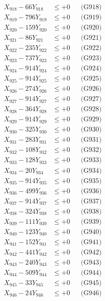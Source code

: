 \documentclass[a4paper,10pt]{article}
\begin{document}
{\begin{align}
X_{918} - 66Y_{918} &\leq +0 && \text{(G918)} \\
X_{919} - 796Y_{919} &\leq +0 && \text{(G919)} \\
X_{920} - 159Y_{920} &\leq +0 && \text{(G920)} \\
\allowbreak
X_{921} - 86Y_{921} &\leq +0 && \text{(G921)} \\
X_{922} - 235Y_{922} &\leq +0 && \text{(G922)} \\
X_{923} - 737Y_{923} &\leq +0 && \text{(G923)} \\
X_{924} - 914Y_{924} &\leq +0 && \text{(G924)} \\
X_{925} - 914Y_{925} &\leq +0 && \text{(G925)} \\
X_{926} - 274Y_{926} &\leq +0 && \text{(G926)} \\
X_{927} - 914Y_{927} &\leq +0 && \text{(G927)} \\
X_{928} - 364Y_{928} &\leq +0 && \text{(G928)} \\
X_{929} - 914Y_{929} &\leq +0 && \text{(G929)} \\
X_{930} - 325Y_{930} &\leq +0 && \text{(G930)} \\
\allowbreak
X_{931} - 283Y_{931} &\leq +0 && \text{(G931)} \\
X_{932} - 108Y_{932} &\leq +0 && \text{(G932)} \\
X_{933} - 128Y_{933} &\leq +0 && \text{(G933)} \\
X_{934} - 20Y_{934} &\leq +0 && \text{(G934)} \\
X_{935} - 914Y_{935} &\leq +0 && \text{(G935)} \\
X_{936} - 499Y_{936} &\leq +0 && \text{(G936)} \\
X_{937} - 914Y_{937} &\leq +0 && \text{(G937)} \\
X_{938} - 324Y_{938} &\leq +0 && \text{(G938)} \\
X_{939} - 111Y_{939} &\leq +0 && \text{(G939)} \\
X_{940} - 123Y_{940} &\leq +0 && \text{(G940)} \\
\allowbreak
X_{941} - 152Y_{941} &\leq +0 && \text{(G941)} \\
X_{942} - 441Y_{942} &\leq +0 && \text{(G942)} \\
X_{943} - 240Y_{943} &\leq +0 && \text{(G943)} \\
X_{944} - 509Y_{944} &\leq +0 && \text{(G944)} \\
X_{945} - 33Y_{945} &\leq +0 && \text{(G945)} \\
X_{946} - 24Y_{946} &\leq +0 && \text{(G946)} \\

\end{align}}
\end{document}
